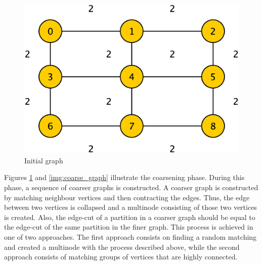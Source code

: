 \documentclass[abstract=on,9pt,twocolumn]{scrartcl}
\begin{document}
\begin{center}
  \begin{figure}[htb]
    \includegraphics[width=\columnwidth]{img/coarsening.eps}
    \caption{Initial graph}
    \label{img:init_graph}
  \end{figure} 
\end{center}

Figures \ref{img:init_graph} and \ref{img:coarse_graph} illustrate the coarsening phase. During this phase, a sequence of coarser graphs is constructed.\cite{Karypis95parallelmultilevel} A coarser graph is constructed by matching neighbour vertices and then contracting the edges. Thus, the edge between two vertices is collapsed and a multinode consisting of those two vertices is created. Also, the edge-cut of a partition in a coarser graph should be equal to the edge-cut of the same partition in the finer graph.\cite{Karypis:1998:FHQ:305219.305248} This process is achieved in one of two approaches. The first approach consists on finding a random matching and created a multinode with the process described above, while the second approach consists of matching groups of vertices that are highly connected.\cite{Karypis:1998:FHQ:305219.305248}
\end{document}
